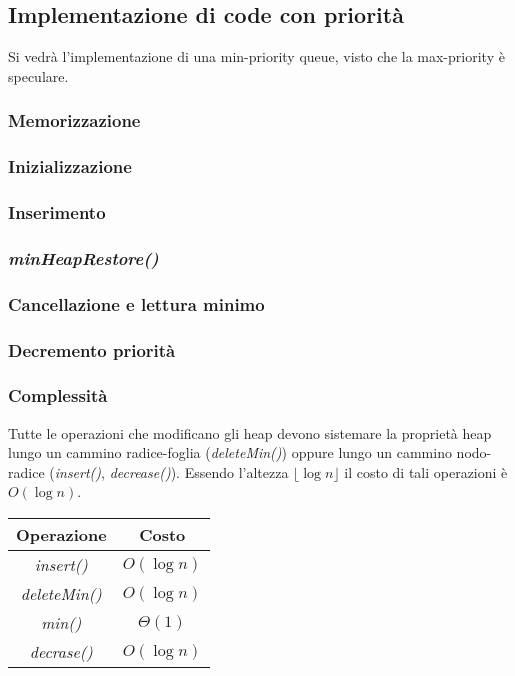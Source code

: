 \subsection{Implementazione di code con priorit\`a}
Si vedr\`a l'implementazione di una min-priority queue, visto che la max-priority \`e speculare. 
\subsubsection{Memorizzazione}



\subsubsection{Inizializzazione}

\subsubsection{Inserimento}

\subsubsection{\emph{minHeapRestore()}}

\subsubsection{Cancellazione e lettura minimo}



\subsubsection{Decremento priorit\`a}

\subsubsection{Complessit\`a}
Tutte le operazioni che modificano gli heap devono sistemare la propriet\`a heap lungo un cammino radice-foglia (\emph{deleteMin()}) oppure lungo un cammino
nodo-radice (\emph{insert()}, \emph{decrease()}). Essendo l'altezza $\lfloor\log n\rfloor$ il costo di tali operazioni \`e $O(\log n)$.
\begin{center}
\begin{tabular}{|c|c|}
\hline
Operazione & Costo\\
\hline
\emph{insert()}& $O(\log n)$\\
\hline
\emph{deleteMin()} & $O(\log n)$\\
\hline
\emph{min()} & $\Theta(1)$\\
\hline
\emph{decrase()} & $O(\log n)$\\
\hline
\end{tabular}
\end{center}
